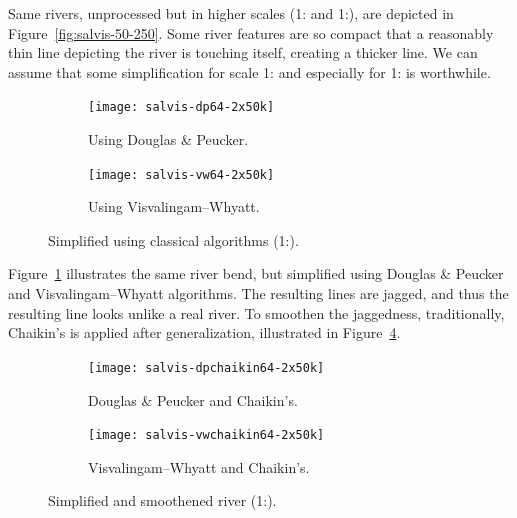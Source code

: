 \documentclass[a4paper]{article}
\newcommand{\DP}{Douglas \& Peucker}
\newcommand{\VW}{Visvalingam--Whyatt}
\begin{document}
Same rivers, unprocessed but in higher scales (1: and
1:), are depicted in Figure~\ref{fig:salvis-50-250}. Some
river features are so compact that a reasonably thin line depicting the river
is touching itself, creating a thicker line. We can assume that some
simplification for scale 1: and especially for
1: is worthwhile.

\begin{figure}[ht]
    \centering
    \begin{subfigure}[b]{.49\textwidth}
        \texttt{[image: salvis-dp64-2x50k]}
        \caption{Using {\DP}.}
    \end{subfigure}
    \hfill
    \begin{subfigure}[b]{.49\textwidth}
        \texttt{[image: salvis-vw64-2x50k]}
        \caption{Using {\VW}.}
    \end{subfigure}
    \caption{Simplified using classical algorithms (1:).}
    \label{fig:salvis-generalized-1x50k}
\end{figure}

Figure~\ref{fig:salvis-generalized-1x50k} illustrates the same river bend, but
simplified using {\DP} and {\VW} algorithms. The resulting lines are jagged,
and thus the resulting line looks unlike a real river. To smoothen the jaggedness,
traditionally, Chaikin's\cite{chaikin1974algorithm} is applied after
generalization, illustrated in Figure~\ref{fig:salvis-generalized-chaikin-1x50k}.

\begin{figure}[ht!]
    \centering
    \begin{subfigure}[b]{.49\textwidth}
        \texttt{[image: salvis-dpchaikin64-2x50k]}
        \caption{{\DP} and Chaikin's.}
        \label{fig:salvis-dpchaikin64-2x50k}
    \end{subfigure}
    \hfill
    \begin{subfigure}[b]{.49\textwidth}
        \texttt{[image: salvis-vwchaikin64-2x50k]}
        \caption{{\VW} and Chaikin's.}
        \label{fig:salvis-vwchaikin64-2x50k}
    \end{subfigure}
    \caption{Simplified and smoothened river (1:).}
    \label{fig:salvis-generalized-chaikin-1x50k}
\end{figure}
\end{document}
